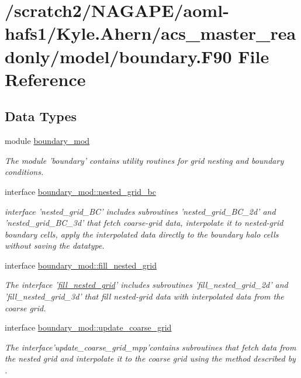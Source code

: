 \section{/scratch2/\-N\-A\-G\-A\-P\-E/aoml-\/hafs1/\-Kyle.Ahern/acs\-\_\-master\-\_\-readonly/model/boundary.F90 File Reference}
\label{boundary_8F90}
\subsection*{Data Types}
\begin{DoxyCompactItemize}
\item 
module \hyperlink{classboundary__mod}{boundary\-\_\-mod}
\begin{DoxyCompactList}\small\item\em The module 'boundary' contains utility routines for grid nesting and boundary conditions. \end{DoxyCompactList}\item 
interface \hyperlink{interfaceboundary__mod_1_1nested__grid__bc}{boundary\-\_\-mod\-::nested\-\_\-grid\-\_\-bc}
\begin{DoxyCompactList}\small\item\em interface 'nested\-\_\-grid\-\_\-\-B\-C' includes subroutines 'nested\-\_\-grid\-\_\-\-B\-C\-\_\-2d' and 'nested\-\_\-grid\-\_\-\-B\-C\-\_\-3d' that fetch coarse-\/grid data, interpolate it to nested-\/grid boundary cells, apply the interpolated data directly to the boundary halo cells without saving the datatype. \end{DoxyCompactList}\item 
interface \hyperlink{interfaceboundary__mod_1_1fill__nested__grid}{boundary\-\_\-mod\-::fill\-\_\-nested\-\_\-grid}
\begin{DoxyCompactList}\small\item\em The interface '\hyperlink{interfaceboundary__mod_1_1fill__nested__grid}{fill\-\_\-nested\-\_\-grid}' includes subroutines 'fill\-\_\-nested\-\_\-grid\-\_\-2d' and 'fill\-\_\-nested\-\_\-grid\-\_\-3d' that fill nested-\/grid data with interpolated data from the coarse grid. \end{DoxyCompactList}\item 
interface \hyperlink{interfaceboundary__mod_1_1update__coarse__grid}{boundary\-\_\-mod\-::update\-\_\-coarse\-\_\-grid}
\begin{DoxyCompactList}\small\item\em The interface'update\-\_\-coarse\-\_\-grid\-\_\-mpp'contains subroutines that fetch data from the nested grid and interpolate it to the coarse grid using the method described by \cite{harris2013two}. \end{DoxyCompactList}\end{DoxyCompactItemize}
